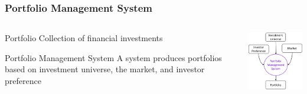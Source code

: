 \begin{frame}
\frametitle{Portfolio Management System}
\begin{columns}
\begin{column}{0.55\textwidth}
\begin{block}{Portfolio}
Collection of financial investments
\end{block}
\begin{block}{Portfolio Management System}
A system produces portfolios based on investment universe, the market, and investor preference
\end{block}
\end{column}
\begin{column}{0.45\textwidth}
\begin{center}
\includegraphics[width=4.8cm]{images/portfolio_management_system.png}
\end{center}
\end{column}
\end{columns}
\end{frame}


